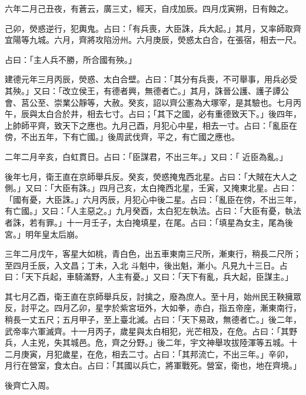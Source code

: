 \begin{pinyinscope}
 六年二月己丑夜，有蒼云，廣三丈，經天，自戌加辰。四月戊寅朔，日有蝕之。



 己卯，熒惑逆行，犯輿鬼。占曰：「有兵喪，大臣誅，兵大起。」其月，又率師取齊宜陽等九城。六月，齊將攻陷汾州。六月庚辰，熒惑太白合，在張宿，相去一尺。



 占曰：「主人兵不勝，所合國有殃。」



 建德元年三月丙辰，熒惑、太白合壁。占曰：「其分有兵喪，不可舉事，用兵必受其殃。」又曰：「改立侯王，有德者興，無德者亡。」其月，誅晉公護、護子譚公會、莒公至、崇業公靜等，大赦。癸亥，詔以齊公憲為大塚宰，是其驗也。七月丙午，辰與太白合於井，相去七寸。占曰；「其下之國，必有重德致天下。」後四年，上帥師平齊，致天下之應也。九月己酉，月犯心中星，相去一寸。占曰：「亂臣在傍，不出五年，下有亡國。」後周武伐齊，平之，有亡國之應也。



 二年二月辛亥，白虹貫日。占曰：「臣謀君，不出三年。」又曰：「
 近臣為亂。」



 後年七月，衛王直在京師舉兵反。癸亥，熒惑掩鬼西北星。占曰：「大賊在大人之側。」又曰：「大臣有誅。」四月己亥，太白掩西北星，壬寅，又掩東北星。占曰：「國有憂，大臣誅。」六月丙辰，月犯心中後二星。占曰：「亂臣在傍，不出三年，有亡國。」又曰：「人主惡之。」九月癸酉，太白犯左執法。占曰：「大臣有憂，執法者誅，若有罪。」十一月壬子，太白掩填星，在尾。占曰：「填星為女主，尾為後宮。」明年皇太后崩。



 三年二月戊午，客星大如桃，青白色，出五車東南三尺所，漸東行，稍長二尺所；至四月壬辰，入文昌；丁未，入北
 斗魁中，後出魁，漸小。凡見九十三日。占曰：「天下兵起，車騎滿野，人主有憂。」又曰：「天下有亂，兵大起，臣謀主。」



 其七月乙酉，衛王直在京師舉兵反，討擒之，廢為庶人。至十月，始州民王鞅擁眾反，討平之。四月乙卯，星孛於紫宮垣外，大如拳，赤白，指五帝座，漸東南行，稍長一丈五尺；五月甲子，至上臺北滅。占曰：「天下易政，無德者亡。」後二年，武帝率六軍滅齊。十一月丙子，歲星與太白相犯，光芒相及，在危。占曰：「其野兵，人主兇，失其城邑。危，齊之分野。」後二年，宇文神舉攻拔陸渾等五城。十二月庚寅，月犯歲星，在危，相去二寸。占曰：「其邦流亡，不出三年。」辛卯，
 月行在營室，食太白。占曰：「其國以兵亡，將軍戰死。營室，衛也，地在齊境。」



 後齊亡入周。




\end{pinyinscope}
